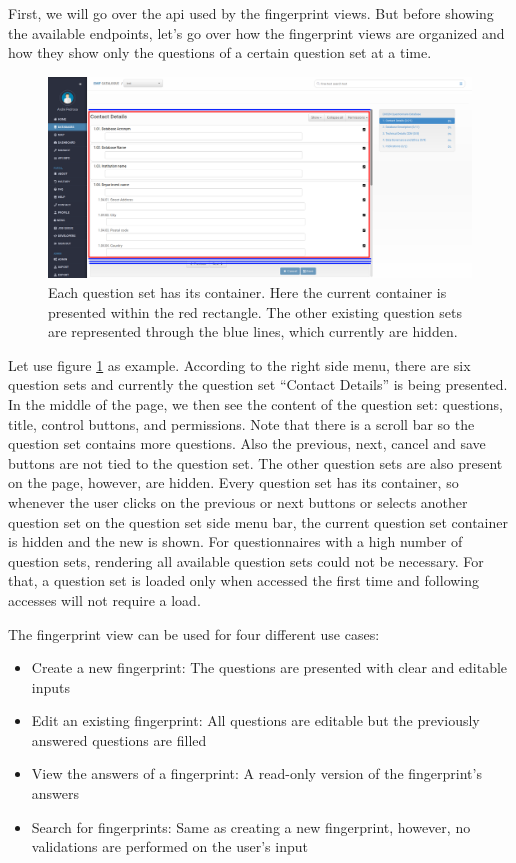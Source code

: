 First, we will go over the \gls{api} used by the fingerprint views.
But before showing the available endpoints, let's go over how the fingerprint views are organized and how they show only the questions of a certain question set at a time.

\begin{figure}
    \center
    \includegraphics[width=\textwidth]{fingerprint-hidden-question-sets}
    \caption{Each question set has its container.
    Here the current container is presented within the red rectangle.
    The other existing question sets are represented through the blue lines, which currently are hidden.}
    \label{fig:fingerprint-hidden-question-sets}
\end{figure}

Let use figure \ref{fig:fingerprint-hidden-question-sets} as example.
According to the right side menu, there are six question sets and currently the question set ``Contact Details'' is being presented.
In the middle of the page, we then see the content of the question set: questions, title, control buttons, and permissions.
Note that there is a scroll bar so the question set contains more questions.
Also the previous, next, cancel and save buttons are not tied to the question set.
The other question sets are also present on the page, however, are hidden.
Every question set has its container, so whenever the user clicks on the previous or next buttons or selects another question set on the question set side menu bar, the current question set container is hidden and the new is shown.
For questionnaires with a high number of question sets, rendering all available question sets could not be necessary.
For that, a question set is loaded only when accessed the first time and following accesses will not require a load.

The fingerprint view can be used for four different use cases:
\begin{itemize}
    \item Create a new fingerprint: The questions are presented with clear and editable inputs
    \item Edit an existing fingerprint: All questions are editable but the previously answered questions are filled
    \item View the answers of a fingerprint: A read-only version of the fingerprint's answers
    \item Search for fingerprints: Same as creating a new fingerprint, however, no validations are performed on the user's input
\end{itemize}


